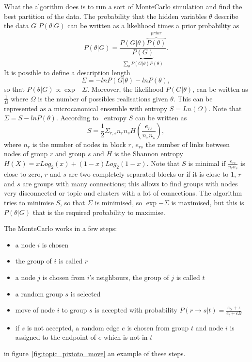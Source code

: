 What the algorithm does is to run a sort of MonteCarlo simulation and find the best partition of the data.
The probability that the hidden variables $\theta$ describe the data $G$ $P(\theta | G)$ can be written as a likelihood times a prior probability as 
\[P(\theta|G)=\frac{P(G|\theta)\overbrace{P(\theta)}^{prior}}{\underbrace{P(G)}_{\sum_{\theta}P(G|\theta)P(\theta)}}.\]
It is possible to define a description length
\[
\Sigma=-lnP(G|\theta)-lnP(\theta),
\]
so that $P(\theta | G)\propto \exp{-\Sigma}$.
Moreover, the likelihood $P(G | \theta)$, can be written as $\frac{1}{\Omega}$ where $\Omega$ is the number of possibles realisations given $\theta$. This can be represented as a microcanonical ensemble with entropy $S=Ln\left(\Omega\right)$. Note that $\Sigma=S-lnP(\theta)$.
According to~\cite{peixoto2017nonparametric} entropy $S$ can be written as
\[
S=\frac{1}{2}\Sigma_{r,s} n_rn_sH\left(\frac{e_{rs}}{n_rn_s}\right),
\]
where $n_r$ is the number of nodes in block $r$, $e_{rs}$ the number of links between nodes of group $r$ and group $s$ and $H$ is the Shannon entropy $H(X)=xLog_2(x)+(1-x)Log_2(1-x)$. Note that $S$ is minimal if $\frac{e_{rs}}{n_rn_s}$ is close to zero, $r$ and $s$ are two completely separated blocks or if it is close to $1$, $r$ and $s$ are groups with many connections; this allows to find groups with nodes very disconnected or topic and clusters with a lot of connections.
The algorithm tries to minimise $S$, so that $\Sigma$ is minimised, so $\exp{-\Sigma}$ is maximised, but this is $P(\theta | G)$ that is the required probability to maximise.

The MonteCarlo works in a few steps:
\begin{itemize}
 \item a node $i$ is chosen
 \item the group of $i$ is called $r$
  \item a node $j$ is chosen from $i$'s neighbours, the group of $j$ is called $t$
  \item a random group $s$ is selected
  \item move of node $i$ to group $s$ is accepted with probability $P(r\to s|t)=\frac{e_{ts}+\epsilon}{e_t+\epsilon B}$
  \item if $s$ is not accepted, a random edge $e$ is chosen from group $t$ and node $i$ is assigned to the endpoint of $e$ which is not in $t$
\end{itemize}
in figure~\ref{fig:topic_pixioto_move} an example of these steps.


